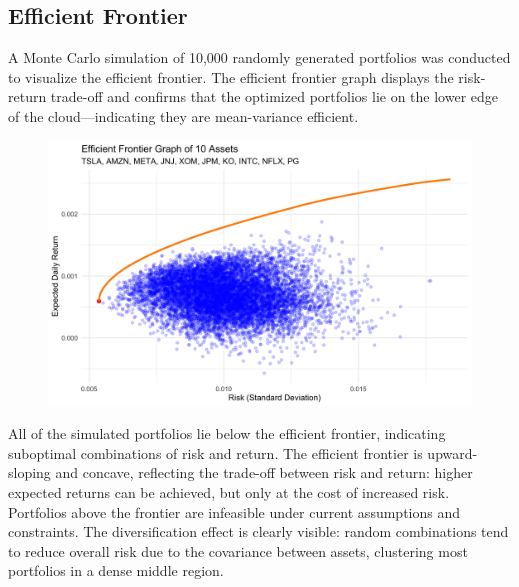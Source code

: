 \documentclass[11pt]{article}
\begin{document}
\subsection*{Efficient Frontier}
A Monte Carlo simulation of 10,000 randomly generated portfolios was conducted to visualize the efficient frontier. The efficient frontier graph displays the risk-return trade-off and confirms that the optimized portfolios lie on the lower edge of the cloud—indicating they are mean-variance efficient.\par
\begin{figure}[H]
    \centering
    \begin{minipage}{0.6\textwidth}
        \includegraphics[width=\linewidth]{Findings_Yutong/efficient_frontier_plot.png}
    \end{minipage}%
    \hfill
    \begin{minipage}{0.35\textwidth}
        \label{eff-fro}
    \end{minipage}
\end{figure}
All of the simulated portfolios lie below the efficient frontier, indicating suboptimal combinations of risk and return. The efficient frontier is upward-sloping and concave, reflecting the trade-off between risk and return: higher expected returns can be achieved, but only at the cost of increased risk. Portfolios above the frontier are infeasible under current assumptions and constraints. The diversification effect is clearly visible: random combinations tend to reduce overall risk due to the covariance between assets, clustering most portfolios in a dense middle region.
\end{document}

